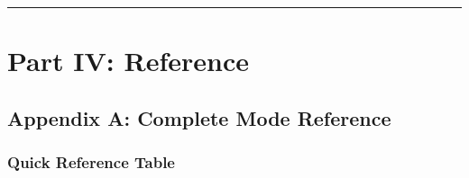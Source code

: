 \documentclass[11pt,a4paper,oneside,english]{book}
\begin{document}
\begin{center}\rule{0.5\linewidth}{0.5pt}\end{center}

\clearpage

\clearpage

\hypertarget{part-iv-reference}{%
\part{Part IV: Reference}\label{part-iv-reference}}

\hypertarget{appendix-a-complete-mode-reference}{%
\chapter{Appendix A: Complete Mode
Reference}\label{appendix-a-complete-mode-reference}}

\hypertarget{quick-reference-table}{%
\section{Quick Reference Table}\label{quick-reference-table}}
\end{document}

